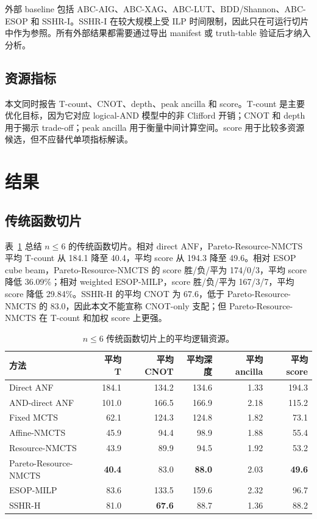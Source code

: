 \documentclass[UTF8,fontset=macnew,11pt]{ctexart}
\newcommand{\method}{Resource-NMCTS}
\newcommand{\pareto}{Pareto-Resource-NMCTS}
\begin{document}
外部 baseline 包括 ABC-AIG、ABC-XAG、ABC-LUT、BDD/Shannon、ABC-ESOP 和 SSHR-I。SSHR-I 在较大规模上受 ILP 时间限制，因此只在可运行切片中作为参照。所有外部结果都需要通过导出 manifest 或 truth-table 验证后才纳入分析。

\subsection{资源指标}

本文同时报告 T-count、CNOT、depth、peak ancilla 和 score。T-count 是主要优化目标，因为它对应 logical-AND 模型中的非 Clifford 开销；CNOT 和 depth 用于揭示 trade-off；peak ancilla 用于衡量中间计算空间。score 用于比较多资源候选，但不应替代单项指标解读。

\section{结果}

\subsection{传统函数切片}

表~\ref{tab:traditional} 总结 $n\leq 6$ 的传统函数切片。相对 direct ANF，\pareto{} 平均 T-count 从 184.1 降至 40.4，平均 score 从 194.3 降至 49.6。相对 ESOP cube beam，\pareto{} 的 score 胜/负/平为 174/0/3，平均 score 降低 36.09\%；相对 weighted ESOP-MILP，score 胜/负/平为 167/3/7，平均 score 降低 29.84\%。SSHR-H 的平均 CNOT 为 67.6，低于 \pareto{} 的 83.0，因此本文不能宣称 CNOT-only 支配；但 \pareto{} 在 T-count 和加权 score 上更强。

\begin{table}[t]
\centering
\small
\caption{$n\leq 6$ 传统函数切片上的平均逻辑资源。}
\label{tab:traditional}
\begin{tabular}{lrrrrr}
\toprule
方法 & 平均 T & 平均 CNOT & 平均深度 & 平均 ancilla & 平均 score \\
\midrule
Direct ANF & 184.1 & 134.2 & 134.6 & 1.33 & 194.3 \\
AND-direct ANF & 101.0 & 166.5 & 166.9 & 2.18 & 115.2 \\
Fixed MCTS & 62.1 & 124.3 & 124.8 & 1.82 & 73.1 \\
Affine-NMCTS & 45.9 & 94.4 & 98.9 & 1.88 & 55.4 \\
\method{} & 43.9 & 89.9 & 94.5 & 1.92 & 53.2 \\
\pareto{} & \textbf{40.4} & 83.0 & \textbf{88.0} & 2.03 & \textbf{49.6} \\
ESOP-MILP & 83.6 & 133.5 & 159.6 & 2.32 & 96.7 \\
SSHR-H & 81.0 & \textbf{67.6} & 88.7 & 1.36 & 88.2 \\
\bottomrule
\end{tabular}
\end{table}
\end{document}
